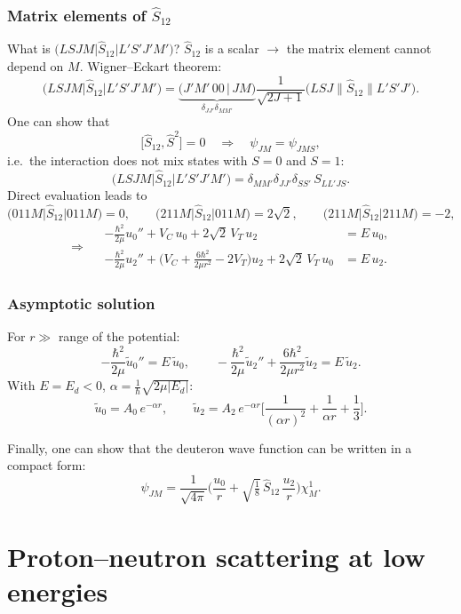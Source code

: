 \documentclass[11pt,a4paper]{article}
\newcommand{\op}[1]{\hat{#1}}
\begin{document}
\subsubsection*{Matrix elements of \texorpdfstring{$\op S_{12}$}{S12}}

What is $\big(LSJM\big|\op S_{12}\big|L'S'J'M'\big)$? $\op S_{12}$ is a scalar
$\to$ the matrix element cannot depend on $M$. Wigner--Eckart theorem:
\[
\big(LSJM\big|\op S_{12}\big|L'S'J'M'\big)
=\underbrace{\big(J'M'\,00\,|\,JM\big)}_{\delta_{JJ'}\delta_{MM'}}
\frac{1}{\sqrt{2J+1}}\big(LSJ\big\|\op S_{12}\big\|L'S'J'\big).
\]
One can show that
\[
\big[\op S_{12},\op S^2\big]=0
\quad\Rightarrow\quad \psi_{JM}=\psi_{JMS},
\]
i.e.\ the interaction does not mix states with $S=0$ and $S=1$:
\[
\big(LSJM\big|\op S_{12}\big|L'S'J'M'\big)=\delta_{MM'}\delta_{JJ'}\delta_{SS'}\,S_{LL'JS}.
\]
Direct evaluation leads to
\[
\big(011M\big|\op S_{12}\big|011M\big)=0,\qquad
\big(211M\big|\op S_{12}\big|011M\big)=2\sqrt2,\qquad
\big(211M\big|\op S_{12}\big|211M\big)=-2,
\]
\[
\Rightarrow\quad
\begin{aligned}
-\frac{\hbar^2}{2\mu}u_0''+V_C\,u_0+2\sqrt2\,V_T\,u_2&=E\,u_0,\\
-\frac{\hbar^2}{2\mu}u_2''+\Big(V_C+\frac{6\hbar^2}{2\mu r^2}-2V_T\Big)u_2+2\sqrt2\,V_T\,u_0&=E\,u_2 .
\end{aligned}
\]

\subsubsection*{Asymptotic solution}

For $r\gg$ range of the potential:
\[
-\frac{\hbar^2}{2\mu}\tilde u_0''=E\,\tilde u_0,\qquad
-\frac{\hbar^2}{2\mu}\tilde u_2''+\frac{6\hbar^2}{2\mu r^2}\tilde u_2=E\,\tilde u_2 .
\]
With $E=E_d<0$, $\alpha=\frac1\hbar\sqrt{2\mu|E_d|}$:
\[
\tilde u_0=A_0\,e^{-\alpha r},\qquad
\tilde u_2=A_2\,e^{-\alpha r}\Big[\frac{1}{(\alpha r)^2}+\frac{1}{\alpha r}+\frac13\Big].
\]

Finally, one can show that the deuteron wave function can be written in a
compact form:
\[
\psi_{JM}=\frac{1}{\sqrt{4\pi}}\Big(\frac{u_0}{r}+\sqrt{\tfrac18}\,\op S_{12}\,\frac{u_2}{r}\Big)\chi^1_M .
\]

\section{Proton--neutron scattering at low energies}
\end{document}

